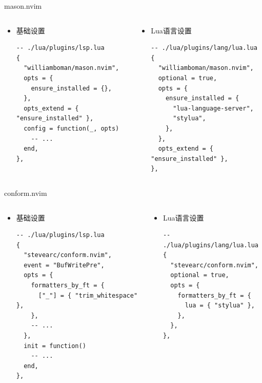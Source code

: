 \documentclass[aspectratio=169]{ctexbeamer}
\begin{document}
\begin{frame}[fragile]{mason.nvim}
  \begin{columns}
    \begin{column}[t]{0.5\linewidth}
      \begin{itemize}
        \item 基础设置
          \begin{lstlisting}[basicstyle=\tiny\ttfamily]
-- ./lua/plugins/lsp.lua
{
  "williamboman/mason.nvim",
  opts = {
    ensure_installed = {},
  },
  opts_extend = { "ensure_installed" },
  config = function(_, opts)
    -- ...
  end,
},
          \end{lstlisting}
      \end{itemize}
    \end{column}

    \begin{column}[t]{0.5\linewidth}
      \begin{itemize}
        \item Lua语言设置
          \begin{lstlisting}[basicstyle=\tiny\ttfamily]
-- ./lua/plugins/lang/lua.lua
{
  "williamboman/mason.nvim",
  optional = true,
  opts = {
    ensure_installed = {
      "lua-language-server",
      "stylua",
    },
  },
  opts_extend = { "ensure_installed" },
},
          \end{lstlisting}
      \end{itemize}
    \end{column}
  \end{columns}
\end{frame}

\begin{frame}[fragile]{conform.nvim}
  \begin{columns}
    \begin{column}[t]{0.5\linewidth}
      \begin{itemize}
        \item 基础设置
          \begin{lstlisting}[basicstyle=\tiny\ttfamily]
-- ./lua/plugins/lsp.lua
{
  "stevearc/conform.nvim",
  event = "BufWritePre",
  opts = {
    formatters_by_ft = {
      ["_"] = { "trim_whitespace" },
    },
    -- ...
  },
  init = function()
    -- ...
  end,
},
          \end{lstlisting}
      \end{itemize}
    \end{column}

    \begin{column}[t]{0.5\linewidth}
      \begin{itemize}
        \item Lua语言设置
          \begin{lstlisting}[basicstyle=\tiny\ttfamily]
-- ./lua/plugins/lang/lua.lua
{
  "stevearc/conform.nvim",
  optional = true,
  opts = {
    formatters_by_ft = {
      lua = { "stylua" },
    },
  },
},
          \end{lstlisting}
      \end{itemize}
    \end{column}
  \end{columns}
\end{frame}
\end{document}
